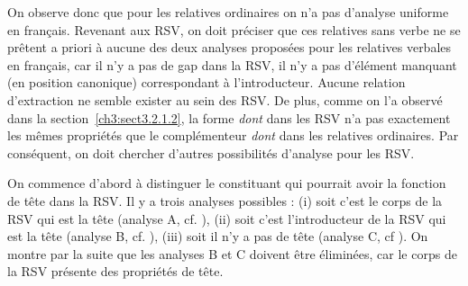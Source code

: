 On observe donc que pour les relatives ordinaires on n’a pas d’analyse uniforme en français. Revenant aux RSV, on doit préciser que ces relatives sans verbe ne se prêtent a priori à aucune des deux analyses proposées pour les relatives verbales en français, car il n’y a pas de gap dans la RSV, {\cad} il n’y a pas d’élément manquant (en position canonique) correspondant à l’introducteur. Aucune relation d’extraction ne semble exister au sein des RSV. De plus, comme on l’a observé dans la section~\ref{ch3:sect3.2.1.2}, la forme \textit{dont} dans les RSV n’a pas exactement les mêmes propriétés que le complémenteur \textit{dont} dans les relatives ordinaires. Par conséquent, on doit chercher d’autres possibilités d’analyse pour les RSV. 

On commence d’abord à distinguer le constituant qui pourrait avoir la fonction de tête dans la RSV. Il y a trois analyses possibles : (i) soit c’est le corps de la RSV qui est la tête (analyse A, cf. ), (ii) soit c’est l’introducteur de la RSV qui est la tête (analyse B, cf. ), (iii) soit il n’y a pas de tête (analyse C, cf ). On montre par la suite que les analyses B et C doivent être éliminées, car le corps de la RSV présente des propriétés de tête. 


  

  

